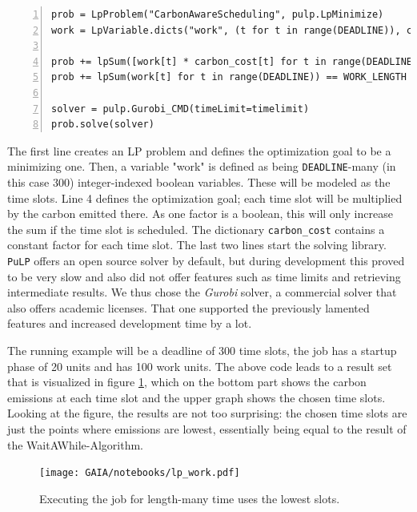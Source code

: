 \begin{lstlisting}[frame=single, numbers=left, caption={LP Implementation for basic scheduling}, label={list:lp_work}, basicstyle=\ttfamily, breaklines]
prob = LpProblem("CarbonAwareScheduling", pulp.LpMinimize)
work = LpVariable.dicts("work", (t for t in range(DEADLINE)), cat="Binary")

prob += lpSum([work[t] * carbon_cost[t] for t in range(DEADLINE)]) 
prob += lpSum(work[t] for t in range(DEADLINE)) == WORK_LENGTH 

solver = pulp.Gurobi_CMD(timeLimit=timelimit)
prob.solve(solver)
\end{lstlisting}

The first line creates an LP problem and defines the optimization goal to be a minimizing one. 
Then, a variable "work" is defined as being \verb|DEADLINE|-many (in this case 300) integer-indexed boolean variables. 
These will be modeled as the time slots.
Line 4 defines the optimization goal; each time slot will be multiplied by the carbon emitted there. As one factor is a boolean, this will only increase the sum if the time slot is scheduled. The dictionary \verb|carbon_cost| contains a constant factor for each time slot.
The last two lines start the solving library. 
\verb|PuLP| offers an open source solver by default, but during development this proved to be very slow and also did not offer features such as time limits and retrieving intermediate results.
We thus chose the \emph{Gurobi} solver, a commercial solver that also offers academic licenses. 
That one supported the previously lamented features and increased development time by a lot. 

The running example will be a deadline of 300 time slots, the job has a startup phase of 20 units and has 100 work units. 
The above code leads to a result set that is visualized in figure \ref{fig:lp_work},
which on the bottom part shows the carbon emissions at each time slot and the upper graph shows the chosen time slots.
Looking at the figure, the results are not too surprising: the chosen time slots are just the points where emissions are lowest, essentially being equal to the result of the WaitAWhile-Algorithm.

\begin{figure}
    \texttt{[image: GAIA/notebooks/lp\_work.pdf]}
    \caption{Executing the job for length-many time uses the lowest slots.}
    \label{fig:lp_work}
\end{figure}    

